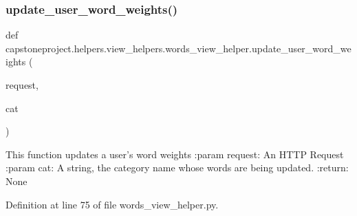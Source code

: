 \subsubsection{\texorpdfstring{update\+\_\+user\+\_\+word\+\_\+weights()}{update\_user\_word\_weights()}}
{\footnotesize\ttfamily def capstoneproject.\+helpers.\+view\+\_\+helpers.\+words\+\_\+view\+\_\+helper.\+update\+\_\+user\+\_\+word\+\_\+weights (\begin{DoxyParamCaption}\item[{}]{request,  }\item[{}]{cat }\end{DoxyParamCaption})}

\begin{DoxyVerb}This function updates a user's word weights
:param request: An HTTP Request
:param cat: A string, the category name whose words are being updated.
:return: None
\end{DoxyVerb}
 

Definition at line 75 of file words\+\_\+view\+\_\+helper.\+py.

